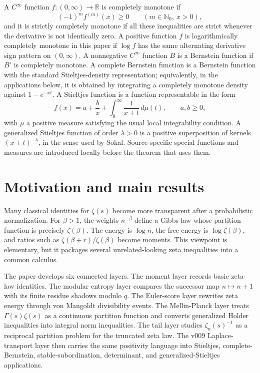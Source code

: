 \documentclass[11pt]{article}
\numberwithin{equation}{section}
\theoremstyle{definition}
\theoremstyle{remark}
\newcommand{\1}{\mathbf 1}
\begin{document}
A \(C^\infty\) function \(f:(0,\infty)\to\mathbb R\) is completely monotone if
\[
  (-1)^m f^{(m)}(x)\ge0\qquad(m\in\mathbb N_0,\ x>0),
\]
and it is strictly completely monotone if all these inequalities are strict
whenever the derivative is not identically zero.  A positive function \(f\) is
logarithmically completely monotone in this paper if \(\log f\) has the same
alternating derivative sign pattern on \((0,\infty)\).  A nonnegative
\(C^\infty\) function \(B\) is a Bernstein function if \(B'\) is completely
monotone.  A complete Bernstein function is a Bernstein function with the
standard Stieltjes-density representation; equivalently, in the applications
below, it is obtained by integrating a completely monotone density against
\(1-e^{-xt}\).  A Stieltjes function is a function representable in the form
\[
  f(x)=a+\frac{b}{x}+\int_0^\infty \frac{1}{x+t}\,d\mu(t),
  \qquad a,b\ge0,
\]
with \(\mu\) a positive measure satisfying the usual local integrability
condition.  A generalized Stieltjes function of order \(\lambda>0\) is a
positive superposition of kernels \((x+t)^{-\lambda}\), in the sense used by
Sokal.  Source-specific special functions and measures are introduced locally
before the theorem that uses them.

\section{Motivation and main results}

Many classical identities for \(\zeta(s)\) become more transparent after a probabilistic normalization.  For \(\beta>1\), the weights \(n^{-\beta}\) define a Gibbs law whose partition function is precisely \(\zeta(\beta)\).  The energy is \(\log n\), the free energy is \(\log\zeta(\beta)\), and ratios such as \(\zeta(\beta+r)/\zeta(\beta)\) become moments.  This viewpoint is elementary, but it packages several unrelated-looking zeta inequalities into a common calculus.

The paper develops six connected layers.  The moment layer records basic zeta-law identities.  The modular entropy layer compares the successor map \(n\mapsto n+1\) with its finite residue shadows modulo \(q\).  The Euler-score layer rewrites zeta energy through von Mangoldt divisibility events.  The Mellin-Planck layer treats \(\Gamma(s)\zeta(s)\) as a continuous partition function and converts generalized Holder inequalities into integral norm inequalities.  The tail layer studies \(\zeta_n(s)^{-1}\) as a reciprocal partition problem for the truncated zeta law.  The v009 Laplace-transport layer then carries the same positivity language into Stieltjes, complete-Bernstein, stable-subordination, determinant, and generalized-Stieltjes applications.
\end{document}
